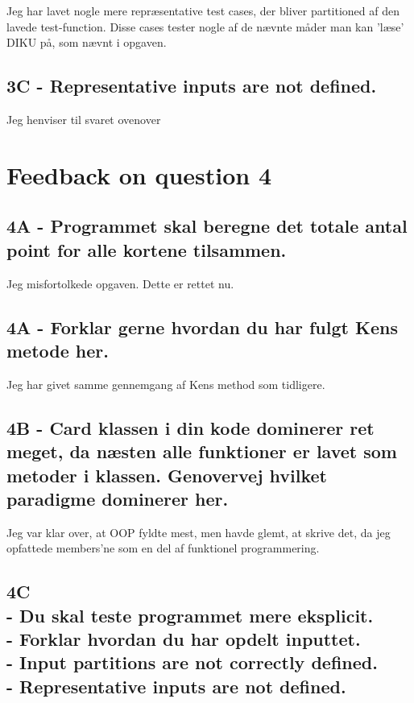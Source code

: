 \documentclass[a4paper,12pt]{article}
\begin{document}
Jeg har lavet nogle mere repræsentative test cases, der bliver partitioned af den lavede test-function. Disse cases tester nogle af de nævnte måder man kan 'læse' DIKU på, som nævnt i opgaven.

\subsection*{3C - Representative inputs are not defined.}

Jeg henviser til svaret ovenover

\section{Feedback on question 4}

\subsection*{4A - Programmet skal beregne det totale antal point for alle kortene tilsammen.}

Jeg misfortolkede opgaven. Dette er rettet nu.

\subsection*{4A - Forklar gerne hvordan du har fulgt Kens metode her.}

Jeg har givet samme gennemgang af Kens method som tidligere.

\subsection*{4B - Card klassen i din kode dominerer ret meget, da næsten alle funktioner er lavet som metoder i klassen.
Genovervej hvilket paradigme dominerer her.}
Jeg var klar over, at OOP fyldte mest, men havde glemt, at skrive det, da jeg opfattede members'ne som en del af funktionel programmering.


\subsection*{4C\\
- Du skal teste programmet mere eksplicit.\\
- Forklar hvordan du har opdelt inputtet.\\
- Input partitions are not correctly defined.\\
- Representative inputs are not defined.}
\end{document}

